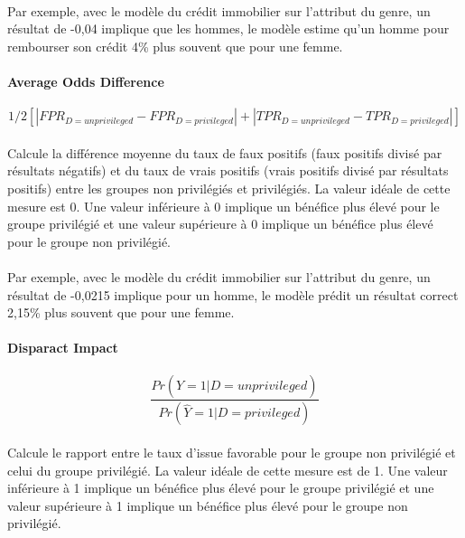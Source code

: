 \documentclass[10pt, french, a4paper]{report}
\begin{document}
\paragraph{}
Par exemple, avec le modèle du crédit immobilier sur l'attribut du genre, un résultat de -0,04 implique que les hommes, le modèle estime qu'un homme pour rembourser son crédit 4\%  plus souvent que pour une femme.

\paragraph{Average Odds Difference}

\begin{equation}\label{eq:ave_odds_diff}
  1/2 [|FPR_{D = unprivileged} - FPR_{D = privileged}| + |TPR_{D = unprivileged} - TPR_{D = privileged}|]
\end{equation}

\paragraph{}
Calcule la différence moyenne du taux de faux positifs (faux positifs divisé par résultats négatifs) et du taux de vrais positifs (vrais positifs divisé par résultats positifs) entre les groupes non privilégiés et privilégiés. La valeur idéale de cette mesure est 0. Une valeur inférieure à 0 implique un bénéfice plus élevé pour le groupe privilégié et une valeur supérieure à 0 implique un bénéfice plus élevé pour le groupe non privilégié.

\paragraph{}
Par exemple, avec le modèle du crédit immobilier sur l'attribut du genre, un résultat de -0,0215 implique pour un homme, le modèle prédit un résultat correct 2,15\%  plus souvent que pour une femme.

\paragraph{Disparact Impact}

\begin{equation}\label{eq:disp_impact}
  \frac{Pr(\hat{Y} = 1 | D = unprivileged)}{Pr(\hat{Y} = 1 | D = privileged)}
\end{equation}

\paragraph{}
Calcule le rapport entre le taux d'issue favorable pour le groupe non privilégié et celui du groupe privilégié. La valeur idéale de cette mesure est de 1. Une valeur inférieure à 1 implique un bénéfice plus élevé pour le groupe privilégié et une valeur supérieure à 1 implique un bénéfice plus élevé pour le groupe non privilégié.
\end{document}
